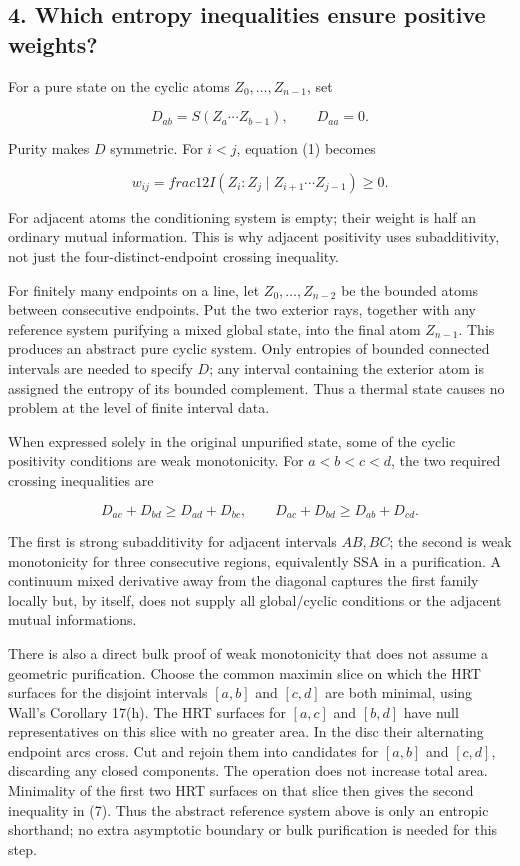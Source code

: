 \documentclass[11pt]{article}
\begin{document}
\subsection{4. Which entropy inequalities ensure positive
weights?}\label{which-entropy-inequalities-ensure-positive-weights}

For a pure state on the cyclic atoms \(Z_0,\ldots,Z_{n-1}\), set

\[
D_{ab}=S(Z_a\cdots Z_{b-1}),\qquad D_{aa}=0.
\]

Purity makes \(D\) symmetric. For \(i<j\), equation (1) becomes

\[
\boxed{w_{ij}=  frac12 I(Z_i:Z_j\mid Z_{i+1}\cdots Z_{j-1})\geq0.} \tag{6}
\]

For adjacent atoms the conditioning system is empty; their weight is
half an ordinary mutual information. This is why adjacent positivity
uses subadditivity, not just the four-distinct-endpoint crossing
inequality.

For finitely many endpoints on a line, let \(Z_0,\ldots,Z_{n-2}\) be the
bounded atoms between consecutive endpoints. Put the two exterior rays,
together with any reference system purifying a mixed global state, into
the final atom \(Z_{n-1}\). This produces an abstract pure cyclic
system. Only entropies of bounded connected intervals are needed to
specify \(D\); any interval containing the exterior atom is assigned the
entropy of its bounded complement. Thus a thermal state causes no
problem at the level of finite interval data.

When expressed solely in the original unpurified state, some of the
cyclic positivity conditions are weak monotonicity. For \(a<b<c<d\), the
two required crossing inequalities are

\[
D_{ac}+D_{bd}\geq D_{ad}+D_{bc},\qquad
D_{ac}+D_{bd}\geq D_{ab}+D_{cd}.                              \tag{7}
\]

The first is strong subadditivity for adjacent intervals \(AB,B C\); the
second is weak monotonicity for three consecutive regions, equivalently
SSA in a purification. A continuum mixed derivative away from the
diagonal captures the first family locally but, by itself, does not
supply all global/cyclic conditions or the adjacent mutual informations.

There is also a direct bulk proof of weak monotonicity that does not
assume a geometric purification. Choose the common maximin slice on
which the HRT surfaces for the disjoint intervals \([a,b]\) and
\([c,d]\) are both minimal, using Wall's Corollary 17(h). The HRT
surfaces for \([a,c]\) and \([b,d]\) have null representatives on this
slice with no greater area. In the disc their alternating endpoint arcs
cross. Cut and rejoin them into candidates for \([a,b]\) and \([c,d]\),
discarding any closed components. The operation does not increase total
area. Minimality of the first two HRT surfaces on that slice then gives
the second inequality in (7). Thus the abstract reference system above
is only an entropic shorthand; no extra asymptotic boundary or bulk
purification is needed for this step.
\end{document}
